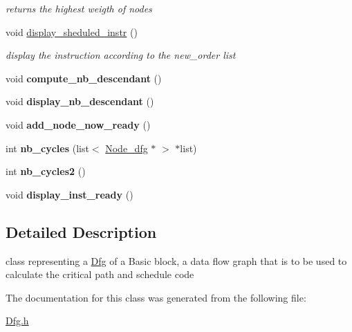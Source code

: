 \begin{DoxyCompactItemize}
\begin{DoxyCompactList}\small\item\em returns the highest weigth of nodes \end{DoxyCompactList}\item 
\hypertarget{classDfg_ad64fa53f2c4bf0b62b372a4fe4a4df98}{void \hyperlink{classDfg_ad64fa53f2c4bf0b62b372a4fe4a4df98}{display\-\_\-sheduled\-\_\-instr} ()}\label{classDfg_ad64fa53f2c4bf0b62b372a4fe4a4df98}

\begin{DoxyCompactList}\small\item\em display the instruction according to the new\-\_\-order list \end{DoxyCompactList}\item 
\hypertarget{classDfg_ae2a0906df6dcb5831ec2201a071debe2}{void {\bfseries compute\-\_\-nb\-\_\-descendant} ()}\label{classDfg_ae2a0906df6dcb5831ec2201a071debe2}

\item 
\hypertarget{classDfg_a274bff13eedc5facacbe95792e108403}{void {\bfseries display\-\_\-nb\-\_\-descendant} ()}\label{classDfg_a274bff13eedc5facacbe95792e108403}

\item 
\hypertarget{classDfg_a050c14e970de9bf9a6bd0c55f6261e85}{void {\bfseries add\-\_\-node\-\_\-now\-\_\-ready} ()}\label{classDfg_a050c14e970de9bf9a6bd0c55f6261e85}

\item 
\hypertarget{classDfg_a52ac4ebce84a0dd3922dc840f534ee8a}{int {\bfseries nb\-\_\-cycles} (list$<$ \hyperlink{classNode__dfg}{\-Node\-\_\-dfg} $\ast$ $>$ $\ast$list)}\label{classDfg_a52ac4ebce84a0dd3922dc840f534ee8a}

\item 
\hypertarget{classDfg_a76757c49f42822c2cb0a3598c1c19fda}{int {\bfseries nb\-\_\-cycles2} ()}\label{classDfg_a76757c49f42822c2cb0a3598c1c19fda}

\item 
\hypertarget{classDfg_a31c9547e738f5e761a7361fa64744881}{void {\bfseries display\-\_\-inst\-\_\-ready} ()}\label{classDfg_a31c9547e738f5e761a7361fa64744881}

\end{DoxyCompactItemize}


\subsection{\-Detailed \-Description}
class representing a \hyperlink{classDfg}{\-Dfg} of a \-Basic block, a data flow graph that is to be used to calculate the critical path and schedule code 

\-The documentation for this class was generated from the following file\-:\begin{DoxyCompactItemize}
\item 
\hyperlink{Dfg_8h}{\-Dfg.\-h}\end{DoxyCompactItemize}
